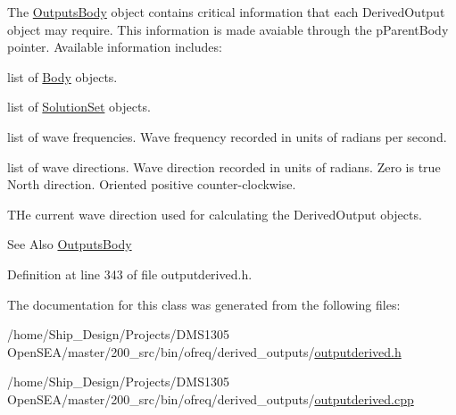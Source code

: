 The \hyperlink{classosea_1_1ofreq_1_1_outputs_body}{Outputs\-Body} object contains critical information that each Derived\-Output object may require. This information is made avaiable through the p\-Parent\-Body pointer. Available information includes\-:
\begin{DoxyItemize}
\item list of \hyperlink{classosea_1_1ofreq_1_1_body}{Body} objects.
\item list of \hyperlink{classosea_1_1ofreq_1_1_solution_set}{Solution\-Set} objects.
\item list of wave frequencies. Wave frequency recorded in units of radians per second.
\item list of wave directions. Wave direction recorded in units of radians. Zero is true North direction. Oriented positive counter-\/clockwise.
\item T\-He current wave direction used for calculating the Derived\-Output objects.
\end{DoxyItemize}

\begin{DoxySeeAlso}{See Also}
\hyperlink{classosea_1_1ofreq_1_1_outputs_body}{Outputs\-Body} 
\end{DoxySeeAlso}


Definition at line 343 of file outputderived.\-h.



The documentation for this class was generated from the following files\-:\begin{DoxyCompactItemize}
\item 
/home/\-Ship\-\_\-\-Design/\-Projects/\-D\-M\-S1305 Open\-S\-E\-A/master/200\-\_\-src/bin/ofreq/derived\-\_\-outputs/\hyperlink{outputderived_8h}{outputderived.\-h}\item 
/home/\-Ship\-\_\-\-Design/\-Projects/\-D\-M\-S1305 Open\-S\-E\-A/master/200\-\_\-src/bin/ofreq/derived\-\_\-outputs/\hyperlink{outputderived_8cpp}{outputderived.\-cpp}\end{DoxyCompactItemize}
